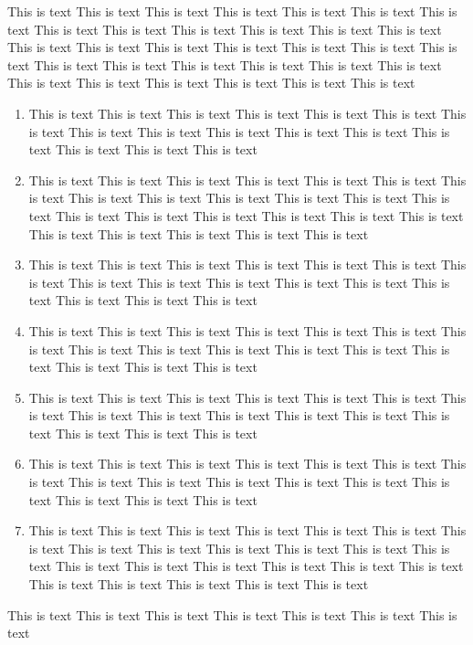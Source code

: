 \documentclass[a4paper]{uestcreport}
\begin{document}
This is text This is text This is text This is text This is text This is text This is text This is text This is text This is text This is text This is text This is text This is text This is text This is text This is text This is text This is text This is text This is text This is text This is text This is text This is text This is text This is text This is text This is text This is text This is text This is text 
\begin{enumerate}
    \item This is text This is text This is text This is text This is text This is text This is text This is text This is text This is text This is text This is text This is text This is text This is text This is text 
    \item This is text This is text This is text This is text This is text This is text This is text This is text This is text This is text This is text This is text This is text This is text This is text This is text This is text This is text This is text This is text This is text This is text This is text This is text 
    \item This is text This is text This is text This is text This is text This is text This is text This is text This is text This is text This is text This is text This is text This is text This is text This is text 
    \item This is text This is text This is text This is text This is text This is text This is text This is text This is text This is text This is text This is text This is text This is text This is text This is text 
    \item This is text This is text This is text This is text This is text This is text This is text This is text This is text This is text This is text This is text This is text This is text This is text This is text 
    \item This is text This is text This is text This is text This is text This is text This is text This is text This is text This is text This is text This is text This is text This is text This is text This is text 
    \item This is text This is text This is text This is text This is text This is text This is text This is text This is text This is text This is text This is text This is text This is text This is text This is text This is text This is text This is text This is text This is text This is text This is text This is text 
\end{enumerate}

This is text This is text This is text This is text This is text This is text This is text 
\end{document}
